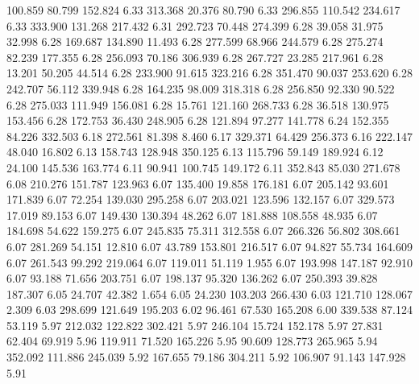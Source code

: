  100.859   80.799  152.824         6.33
 313.368   20.376   80.790         6.33
 296.855  110.542  234.617         6.33
 333.900  131.268  217.432         6.31
 292.723   70.448  274.399         6.28
  39.058   31.975   32.998         6.28
 169.687  134.890   11.493         6.28
 277.599   68.966  244.579         6.28
 275.274   82.239  177.355         6.28
 256.093   70.186  306.939         6.28
 267.727   23.285  217.961         6.28
  13.201   50.205   44.514         6.28
 233.900   91.615  323.216         6.28
 351.470   90.037  253.620         6.28
 242.707   56.112  339.948         6.28
 164.235   98.009  318.318         6.28
 256.850   92.330   90.522         6.28
 275.033  111.949  156.081         6.28
  15.761  121.160  268.733         6.28
  36.518  130.975  153.456         6.28
 172.753   36.430  248.905         6.28
 121.894   97.277  141.778         6.24
 152.355   84.226  332.503         6.18
 272.561   81.398    8.460         6.17
 329.371   64.429  256.373         6.16
 222.147   48.040   16.802         6.13
 158.743  128.948  350.125         6.13
 115.796   59.149  189.924         6.12
  24.100  145.536  163.774         6.11
  90.941  100.745  149.172         6.11
 352.843   85.030  271.678         6.08
 210.276  151.787  123.963         6.07
 135.400   19.858  176.181         6.07
 205.142   93.601  171.839         6.07
  72.254  139.030  295.258         6.07
 203.021  123.596  132.157         6.07
 329.573   17.019   89.153         6.07
 149.430  130.394   48.262         6.07
 181.888  108.558   48.935         6.07
 184.698   54.622  159.275         6.07
 245.835   75.311  312.558         6.07
 266.326   56.802  308.661         6.07
 281.269   54.151   12.810         6.07
  43.789  153.801  216.517         6.07
  94.827   55.734  164.609         6.07
 261.543   99.292  219.064         6.07
 119.011   51.119    1.955         6.07
 193.998  147.187   92.910         6.07
  93.188   71.656  203.751         6.07
 198.137   95.320  136.262         6.07
 250.393   39.828  187.307         6.05
  24.707   42.382    1.654         6.05
  24.230  103.203  266.430         6.03
 121.710  128.067    2.309         6.03
 298.699  121.649  195.203         6.02
  96.461   67.530  165.208         6.00
 339.538   87.124   53.119         5.97
 212.032  122.822  302.421         5.97
 246.104   15.724  152.178         5.97
  27.831   62.404   69.919         5.96
 119.911   71.520  165.226         5.95
  90.609  128.773  265.965         5.94
 352.092  111.886  245.039         5.92
 167.655   79.186  304.211         5.92
 106.907   91.143  147.928         5.91
